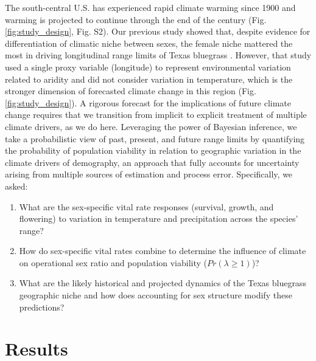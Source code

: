 \documentclass[9pt,twocolumn,twoside,lineno]{pnas-new}
\newcommand{\revise}[1]{{\color{Mahogany}{#1}}}
\begin{document}
The south-central U.S. has experienced rapid climate warming since 1900 and warming is projected to continue through the end of the century (Fig. \ref{fig:study_design}, Fig. S2). 
Our previous study showed that, despite evidence for differentiation of climatic niche between sexes, the female niche mattered the most in driving longitudinal range limits of Texas bluegrass \citep{miller2022two}. 
However, that study used a single proxy variable (longitude) to represent environmental variation related to aridity and did not consider variation in temperature, which is the stronger dimension of forecasted climate change in this region (Fig. \ref{fig:study_design}). 
A rigorous forecast for the implications of future climate change requires that we transition from implicit to explicit treatment of multiple climate drivers, as we do here.
Leveraging the power of Bayesian inference, we take a probabilistic view of past, present, and future range limits by quantifying the probability of population viability \revise{($Pr(\lambda \ge 1)$)} in relation to geographic variation in the climate drivers of demography, an approach that fully accounts for uncertainty arising from multiple sources of estimation and process error. %
Specifically, we asked:
\begin{enumerate}
	\item What are the sex-specific vital rate responses (survival, growth, and flowering) to variation in temperature and precipitation across the species' range?
	\item How do sex-specific vital rates combine to determine the influence of climate on operational sex ratio and population viability ($Pr(\lambda \ge 1)$)?
	\item What are the likely historical and projected dynamics of the Texas bluegrass geographic niche and how does accounting for sex structure modify these predictions?
\end{enumerate}

\section*{Results}
\end{document}
